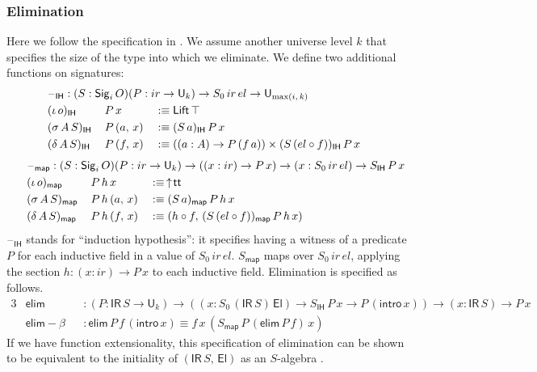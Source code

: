 \documentclass[acmsmall,screen,review,anonymous]{acmart}
\newcommand{\msf}[1]{{\mathsf{#1}}}
\newcommand{\U}{\msf{U}}
\newcommand{\El}{\msf{El}}
\newcommand{\Lift}{\msf{Lift}}
\newcommand{\lup}{\uparrow}
\newcommand{\Sig}{\msf{Sig}}
\newcommand{\ttt}{\msf{tt}}
\newcommand{\blank}{{\mathord{\hspace{1pt}\text{--}\hspace{1pt}}}}
\newcommand{\ir}{{ir}}
\newcommand{\el}{{el}}
\newcommand{\IR}{\msf{IR}}
\newcommand{\intro}{\msf{intro}}
\newcommand{\IH}{\msf{IH}}
\newcommand{\map}{\msf{map}}
\newcommand{\elim}{\msf{elim}}
\begin{document}
\subsubsection{Elimination}\label{sec:ir-elimination}

Here we follow the specification in \cite{TODO}. We assume another universe level $k$ that specifies
the size of the type into which we eliminate. We define two additional functions on signatures:
\begin{alignat*}{3}
  &\rlap{$\blank_\IH : (S : \Sig_i\,O)(P : \ir \to \U_k) \to S_0\,\ir\,\el \to \U_{\max(i,\,k)}$} \\
  &(\iota\,o)_\IH    \,&&P\,x       &&:\equiv \Lift\,\top \\
  &(\sigma\,A\,S)_\IH\,&&P\,(a,\,x) &&:\equiv (S\,a)_\IH\,P\,x \\
  &(\delta\,A\,S)_\IH\,&&P\,(f,\,x) &&:\equiv ((a : A) \to P\,(f\,a)) \times (S\,(\el \circ f))_\IH\,P\,x
\end{alignat*}
\begin{alignat*}{3}
  &\hspace{-7em}\rlap{$\blank_\map : (S : \Sig_i\,O)(P : \ir \to \U_k) \to ((x : \ir) \to P\,x) \to (x : S_0\,\ir\,\el) \to S_\IH\,P\,x$} \\
  &\hspace{-7em}(\iota\,o)_\map    \,&&P\,h\,x       &&:\equiv\,\lup\!\ttt \\
  &\hspace{-7em}(\sigma\,A\,S)_\map\,&&P\,h\,(a,\,x) &&:\equiv (S\,a)_\map\,P\,h\,x \\
  &\hspace{-7em}(\delta\,A\,S)_\map\,&&P\,h\,(f,\,x) &&:\equiv (h \circ f,\,(S\,(\el \circ f))_\map\,P\,h\,x)
\end{alignat*}
$\blank_\IH$ stands for ``induction hypothesis'': it specifies having a witness of a predicate $P$ for
each inductive field in a value of $S_0\,\ir\,\el$. $S_\map$ maps over $S_0\,\ir\,\el$, applying the
section $h : (x : \ir) \to P\,x$ to each inductive field. Elimination is specified as follows.
\begin{alignat*}{3}
  &\elim           &&: (P : \IR\,S \to \U_k) \to ((x : S_0\,(\IR\,S)\,\El) \to S_\IH\,P\,x \to P\,(\intro\,x)) \to (x : \IR\,S) \to P\,x \\
  &\elim\!-\!\!\beta &&: \elim\,P\,f\,(\intro\,x) \equiv f\,x\,(S_\map\,P\,(\elim\,P\,f)\,x)
\end{alignat*}
If we have function extensionality, this specification of elimination can be shown to be equivalent
to the initiality of $(\IR\,S,\,\El)$ as an $S$-algebra \cite{TODO}.
\end{document}
